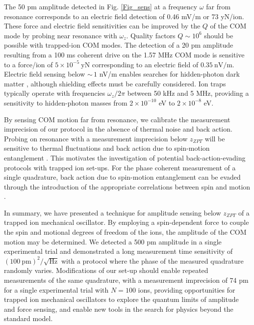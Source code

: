 \documentclass[aps,prl,twocolumn,superscriptaddress,floatfix]{revtex4-1}
\begin{document}
The 50 pm amplitude detected in Fig. \ref{Fig_sens} at a frequency $\omega$ far from resonance corresponds to an electric field detection of 0.46 mV/m or 73 yN/ion. These force and electric field sensitivities can be improved by the $Q$ of the COM mode by probing near resonance with $\omega_z$. Quality factors $Q\sim 10^6$ should be possible with trapped-ion COM modes. The detection of a 20 pm amplitude resulting from a 100 ms coherent drive on the 1.57 MHz COM mode is sensitive to a force/ion of $5\times10^{-5}\:\mathrm{yN}$ corresponding to an electric field of $0.35\:\mathrm{nV/m}$. Electric field sensing below ${\sim} \,1$ nV/m enables searches for hidden-photon dark matter \citep{Arias2012,Chaudhuri2015}, although shielding effects must be carefully considered. Ion traps typically operate with frequencies $\omega_z/2\pi$ between 50 kHz and 5 MHz, providing a sensitivity to hidden-photon masses from $2 \times 10^{-10}$ eV to $2 \times 10^{-8}$ eV. 

By sensing COM motion far from resonance, we calibrate the measurement imprecision of our protocol in the absence of thermal noise and back action. Probing on resonance with a measurement imprecision below $z_{ZPT}$ will be sensitive to thermal fluctuations and back action due to spin-motion entanglement \citep{Sawyer2014}. This motivates the investigation of potential back-action-evading protocols with trapped ion set-ups. For the phase coherent measurement of a single quadrature, back action due to spin-motion entanglement can be evaded through the introduction of the appropriate correlations between spin and motion \citep{Hempel2013}.

In summary, we have presented a technique for amplitude sensing below $z_{ZPT}$ of a trapped ion mechanical oscillator. By employing a spin-dependent force to couple the spin and motional degrees of freedom of the ions, the amplitude of the COM motion may be determined. We detected a 500 pm amplitude in a single experimental trial and demonstrated a long measurement time sensitivity of $\left(100\:\mathrm{pm}\right)^{2}/\sqrt{\mathrm{Hz}}$ with a protocol where the phase of the measured quadrature randomly varies. Modifications of our set-up should enable repeated measurements of the same quadrature, with a measurement imprecision of 74 pm for a single experimental trial with $N = 100$ ions, providing opportunities for trapped ion mechanical oscillators to explore the quantum limits of amplitude and force sensing, and enable new tools in the search for physics beyond the standard model.
\end{document}
